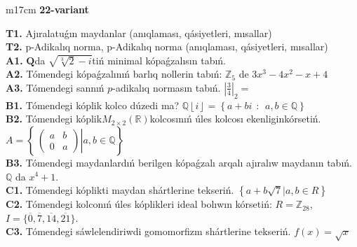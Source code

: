 \documentclass{article}
\begin{document}
\begin{tabular}{m{17cm}}
\textbf{22-variant}
\newline

\textbf{T1.} Ajıralatuǵın maydanlar (anıqlaması, qásiyetleri, mısallar) \\
\textbf{T2.} p-Adikalıq norma, p-Adikalıq norma (anıqlaması, qásiyetleri, mısallar) \\
\textbf{A1.} \(\mathbf{Q}\)da \(\sqrt{\sqrt[3]{2} - i}\)tiń minimal kópaǵzalısın tabıń. \\
\textbf{A2.} Tómendegi kópaǵzalınıń barlıq nollerin tabıń: \(\mathbb{Z}_{5}\) de \(3x^{3} - 4x^{2} - x + 4\) \\
\textbf{A3.} Tómendegi sannıń \(p\)-adikalıq normasın tabıń. \(|\frac{3}{4}|_{2} =\) \\
\textbf{B1.} Tómendegi kóplik kolco dúzedi ma? \(\mathbb{Q}\left\lfloor i \right\rfloor = \left\{ a + bi\ \ :\ \ a,b\mathbb{\in Q} \right\}\) \\
\textbf{B2.} Tómendegi kóplik\(M_{2 \times 2}\left( \mathbb{R} \right)\)kolcosınıń úles kolcosı ekenliginkórsetiń. \(A = \left\{ \left. \ \begin{pmatrix}
a & b \\
0 & a
\end{pmatrix} \right|a,b\mathbb{\in Q} \right\}\) \\
\textbf{B3.} Tómendegi maydanlardıń berilgen kópaǵzalı arqalı ajıralıw maydanın tabıń. \(\mathbb{Q}\) da \(x^{4} + 1\). \\
\textbf{C1.} Tómendegi kóplikti maydan shártlerine tekseriń. \(\left\{ a + b\sqrt{7}|a,b \in R \right\}\) \\
\textbf{C2.} Tómendegi kolconıń úles kóplikleri ideal bolıwın kórsetiń:
\(R = \mathbb{Z}_{28}\), \(I = \{\overline{0},\overline{7},\overline{14},\overline{21}\}\). \\
\textbf{C3.} Tómendegi sáwlelendiriwdi gomomorfizm shártlerine tekseriń. \(f(x) = \sqrt{x}\) \\

\end{tabular}
\vspace{1cm}
\end{document}
